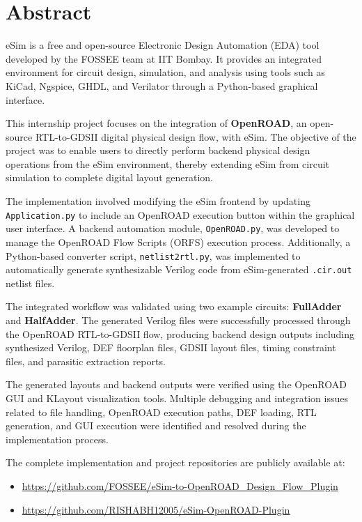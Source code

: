 \chapter*{Abstract}

\noindent
eSim is a free and open-source Electronic Design Automation (EDA) tool developed by the FOSSEE team at IIT Bombay. It provides an integrated environment for circuit design, simulation, and analysis using tools such as KiCad, Ngspice, GHDL, and Verilator through a Python-based graphical interface.

\vspace{0.3cm}

\noindent
This internship project focuses on the integration of \textbf{OpenROAD}, an open-source RTL-to-GDSII digital physical design flow, with eSim. The objective of the project was to enable users to directly perform backend physical design operations from the eSim environment, thereby extending eSim from circuit simulation to complete digital layout generation.

\vspace{0.3cm}

\noindent
The implementation involved modifying the eSim frontend by updating \texttt{Application.py} to include an OpenROAD execution button within the graphical user interface. A backend automation module, \texttt{OpenROAD.py}, was developed to manage the OpenROAD Flow Scripts (ORFS) execution process. Additionally, a Python-based converter script, \texttt{netlist2rtl.py}, was implemented to automatically generate synthesizable Verilog code from eSim-generated \texttt{.cir.out} netlist files.

\vspace{0.3cm}

\noindent
The integrated workflow was validated using two example circuits: \textbf{FullAdder} and \textbf{HalfAdder}. The generated Verilog files were successfully processed through the OpenROAD RTL-to-GDSII flow, producing backend design outputs including synthesized Verilog, DEF floorplan files, GDSII layout files, timing constraint files, and parasitic extraction reports.

\vspace{0.3cm}

\noindent
The generated layouts and backend outputs were verified using the OpenROAD GUI and KLayout visualization tools. Multiple debugging and integration issues related to file handling, OpenROAD execution paths, DEF loading, RTL generation, and GUI execution were identified and resolved during the implementation process.

\vspace{0.3cm}

\noindent
The complete implementation and project repositories are publicly available at:

\begin{itemize}
\item \url{https://github.com/FOSSEE/eSim-to-OpenROAD_Design_Flow_Plugin}

\item \url{https://github.com/RISHABH12005/eSim-OpenROAD-Plugin}
\end{itemize}